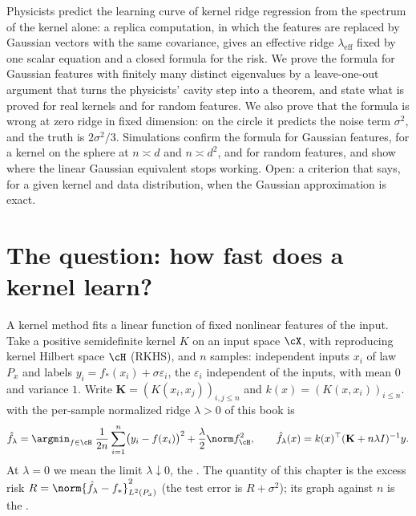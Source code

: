 \begin{refsection}

\newcommand*{\kernelsleff}{\lambda_{\mathrm{eff}}}
\newcommand*{\kernelsdf}{\mathrm{df}}
\newcommand*{\kernelsSh}{\hat\Sigma}
\newcommand*{\kernelsscript}[1]{\texttt{12-kernels-}\allowbreak\texttt{#1}}

\begin{chaptersummary}
Physicists predict the learning curve of kernel ridge regression from the spectrum of the kernel alone: a replica computation, in which the features are replaced by Gaussian vectors with the same covariance, gives an effective ridge $\kernelsleff$ fixed by one scalar equation and a closed formula for the risk. We prove the formula for Gaussian features with finitely many distinct eigenvalues by a leave-one-out argument that turns the physicists' cavity step into a theorem, and state what is proved for real kernels and for random features. We also prove that the formula is wrong at zero ridge in fixed dimension: on the circle it predicts the noise term $\sigma^2$, and the truth is $2\sigma^2/3$. Simulations confirm the formula for Gaussian features, for a kernel on the sphere at $n\asymp d$ and $n\asymp d^2$, and for random features, and show where the linear Gaussian equivalent stops working. Open: a criterion that says, for a given kernel and data distribution, when the Gaussian approximation is exact.
\end{chaptersummary}

\section{The question: how fast does a kernel learn?}\label{sec:kernels:question}

A kernel method fits a linear function of fixed nonlinear features of the input. Take a positive semidefinite kernel $K$ on an input space $\cX$, with reproducing kernel Hilbert space $\cH$ (RKHS), and $n$ samples: independent inputs $x_i$ of law $P_x$ and labels $y_i=f_*(x_i)+\sigma\varepsilon_i$, the $\varepsilon_i$ independent of the inputs, with mean $0$ and variance $1$. Write $\mathbf K=(K(x_i,x_j))_{i,j\le n}$ and $k(x)=(K(x,x_i))_{i\le n}$.  with the per-sample normalized ridge $\lambda>0$ of this book is
\begin{equation}\label{eq:kernels:krr}
\hat f_\lambda=\argmin_{f\in\cH}\;\frac1{2n}\sum_{i=1}^n\bigl(y_i-f(x_i)\bigr)^2+\frac\lambda2\norm f_\cH^2,\qquad\hat f_\lambda(x)=k(x)^\top(\mathbf K+n\lambda I)^{-1}y .
\end{equation}
At $\lambda=0$ we mean the limit $\lambda\downarrow0$, the . The quantity of this chapter is the excess risk $R=\norm{\hat f_\lambda-f_*}^2_{L^2(P_x)}$ (the test error is $R+\sigma^2$); its graph against $n$ is the .


\end{refsection}
